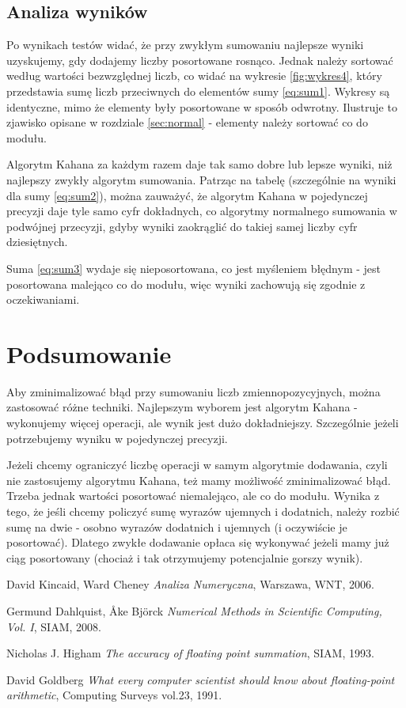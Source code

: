 \documentclass[11pt]{article}
\begin{document}
\newpage
\subsection{Analiza wyników}
Po wynikach testów widać, że przy zwykłym sumowaniu najlepsze wyniki uzyskujemy, gdy dodajemy liczby posortowane rosnąco. Jednak należy sortować  według wartości bezwzględnej liczb, co widać na wykresie \ref{fig:wykres4}, który przedstawia sumę liczb przeciwnych do elementów sumy \ref{eq:sum1}. Wykresy są identyczne, mimo że elementy były posortowane w sposób odwrotny. Ilustruje to zjawisko opisane w rozdziale \ref{sec:normal} - elementy należy sortować co do modułu.


Algorytm Kahana za każdym razem daje tak samo dobre lub lepsze wyniki, niż najlepszy zwykły algorytm sumowania. Patrząc na tabelę (szczególnie na wyniki dla sumy \ref{eq:sum2}), można zauważyć, że algorytm Kahana w pojedynczej precyzji daje tyle samo cyfr dokładnych, co algorytmy normalnego sumowania w podwójnej przecyzji, gdyby wyniki zaokrąglić do takiej samej liczby cyfr dziesiętnych.

Suma \ref{eq:sum3} wydaje się nieposortowana, co jest myśleniem błędnym - jest posortowana malejąco co do modułu, więc wyniki zachowują się zgodnie z oczekiwaniami.
\section{Podsumowanie}
Aby zminimalizować błąd przy sumowaniu liczb zmiennopozycyjnych, można zastosować różne techniki. Najlepszym wyborem jest algorytm Kahana - wykonujemy więcej operacji, ale wynik jest dużo dokładniejszy. Szczególnie jeżeli potrzebujemy wyniku w pojedynczej precyzji.


Jeżeli chcemy ograniczyć liczbę operacji w samym algorytmie dodawania, czyli nie zastosujemy algorytmu Kahana, też mamy możliwość zminimalizować błąd. Trzeba jednak wartości posortować niemalejąco, ale co do modułu. Wynika z tego, że jeśli chcemy policzyć sumę wyrazów ujemnych i dodatnich, należy rozbić sumę na dwie - osobno wyrazów dodatnich i ujemnych (i oczywiście je posortować). Dlatego zwykłe dodawanie opłaca się wykonywać jeżeli mamy już ciąg posortowany (chociaż i tak otrzymujemy potencjalnie gorszy wynik).
\begin{thebibliography}{9}
 David Kincaid, Ward Cheney
\emph{Analiza Numeryczna},
Warszawa, WNT, 2006.

 Germund Dahlquist, Åke Björck 
\emph{Numerical Methods in Scientific Computing, Vol. I},
SIAM, 2008.

 Nicholas J. Higham
\emph{The accuracy of floating point summation},
SIAM, 1993.

 David Goldberg
\emph{What every computer scientist should know about floating-point arithmetic},
Computing Surveys vol.23, 1991.

\end{thebibliography}
\end{document}
